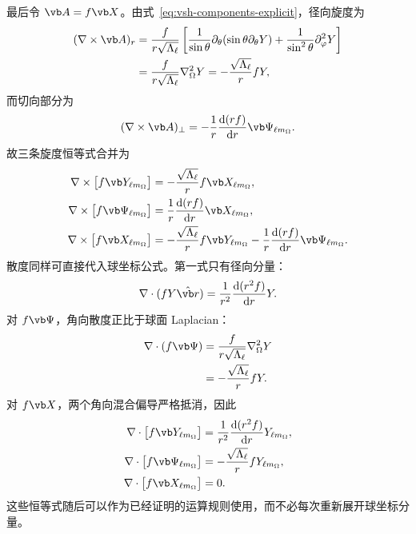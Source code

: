 最后令 $\vb A=f\vb X$。由式~\cref{eq:vsh-components-explicit}，径向旋度为
\begin{align}
(\nabla\times\vb A)_r
&=\frac{f}{r\sqrt{\Lambda_\ell}}
\left[
\frac{1}{\sin\theta}\partial_\theta(\sin\theta\partial_\theta Y)
+\frac{1}{\sin^2\theta}\partial_\varphi^2Y
\right]\\
&=\frac{f}{r\sqrt{\Lambda_\ell}}\nabla_\Omega^2Y
=-\frac{\sqrt{\Lambda_\ell}}{r}fY,
\end{align}
而切向部分为
\begin{equation}
(\nabla\times\vb A)_\perp
=-\frac{1}{r}\frac{\dd(rf)}{\dd r}\vb\Psi_{\ell m_\Omega}.
\end{equation}
故三条旋度恒等式合并为
\begin{align}
\nabla\times\bigl[f\vb Y_{\ell m_{\Omega}}\bigr]
&=-\frac{\sqrt{\Lambda_\ell}}{r}f\vb X_{\ell m_{\Omega}},
\\
\nabla\times\bigl[f\vb\Psi_{\ell m_{\Omega}}\bigr]
&=\frac{1}{r}\frac{\dd(rf)}{\dd r}\vb X_{\ell m_{\Omega}},
\\
\nabla\times\bigl[f\vb X_{\ell m_{\Omega}}\bigr]
&=-\frac{\sqrt{\Lambda_\ell}}{r}f\vb Y_{\ell m_{\Omega}}
-\frac{1}{r}\frac{\dd(rf)}{\dd r}\vb\Psi_{\ell m_{\Omega}}.
\label{eq:vsh-curl-identities}
\end{align}
散度同样可直接代入球坐标公式。第一式只有径向分量：
\begin{equation}
\nabla\cdot(fY\hat{\vb r})
=\frac{1}{r^2}\frac{\dd(r^2f)}{\dd r}Y.
\end{equation}
对 $f\vb\Psi$，角向散度正比于球面 Laplacian：
\begin{align}
\nabla\cdot(f\vb\Psi)
&=\frac{f}{r\sqrt{\Lambda_\ell}}\nabla_\Omega^2Y\\
&=-\frac{\sqrt{\Lambda_\ell}}{r}fY.
\end{align}
对 $f\vb X$，两个角向混合偏导严格抵消，因此
\begin{align}
\nabla\cdot\bigl[f\vb Y_{\ell m_{\Omega}}\bigr]
&=\frac{1}{r^2}\frac{\dd(r^2f)}{\dd r}Y_{\ell m_{\Omega}},\\
\nabla\cdot\bigl[f\vb\Psi_{\ell m_{\Omega}}\bigr]
&=-\frac{\sqrt{\Lambda_\ell}}{r}fY_{\ell m_{\Omega}},\\
\nabla\cdot\bigl[f\vb X_{\ell m_{\Omega}}\bigr]
&=0.
\label{eq:vsh-div-identities}
\end{align}
这些恒等式随后可以作为已经证明的运算规则使用，而不必每次重新展开球坐标分量。

